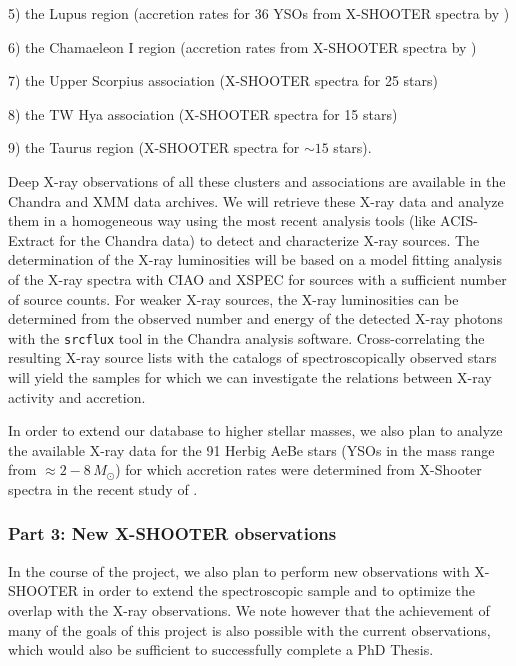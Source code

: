 \documentclass[10pt,fleqn,twoside,a4paper]{article}
\begin{document}
5) the Lupus region (accretion rates for 36 YSOs from X-SHOOTER spectra by \citet{Alcala14})
\smallskip


6) the Chamaeleon I region (accretion rates from X-SHOOTER spectra by \citet{Manara16})
\smallskip

7) the Upper Scorpius association (X-SHOOTER spectra  for 25 stars)
\smallskip

8) the TW Hya association (X-SHOOTER spectra  for 15 stars)
\smallskip

9) the Taurus region (X-SHOOTER spectra  for $\sim 15$ stars).
\medskip



%
Deep X-ray observations of all these clusters and associations are available in the Chandra and XMM data
archives.  We will retrieve these X-ray data and analyze them in a homogeneous way
using the most recent analysis tools (like ACIS-Extract for the Chandra data) to detect
and characterize X-ray sources. The determination of the X-ray luminosities will be
based on a model fitting analysis of the X-ray spectra with CIAO and XSPEC for sources
with a sufficient number of source counts. For weaker X-ray sources, 
the  X-ray luminosities can be determined from the observed number and energy of the 
detected X-ray photons with the {\tt srcflux} tool in the Chandra analysis software.
Cross-correlating the resulting X-ray source lists with the catalogs of spectroscopically
observed stars will yield the samples for which we can investigate the relations between
X-ray activity and accretion.
\smallskip


In order to extend our database to higher stellar masses, we also plan to analyze 
the available X-ray data for the 91 Herbig AeBe stars (YSOs in the mass range from 
$\approx 2 - 8\,M_\odot$) for which 
accretion rates were determined from X-Shooter spectra in 
the recent study of \citet{Fairlamb17}.


\subsubsection*{Part 3:  New X-SHOOTER observations}

In the course of the project, we also plan to perform new
observations with X-SHOOTER in order to extend the
spectroscopic sample and to optimize the overlap with the X-ray
observations. We note however that the achievement of many of the goals of this
project is also possible with the current observations, which would
also be sufficient to successfully complete a PhD Thesis. 
\end{document}
